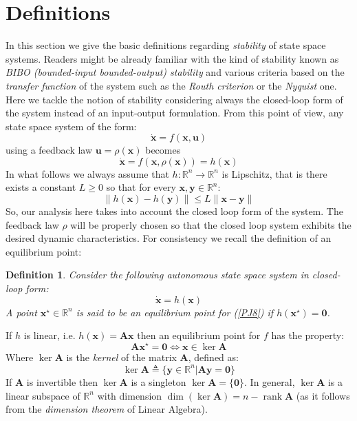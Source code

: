 \documentclass[a4paper,10pt,oneside]{book}
\newtheorem{definition}{Definition}
\begin{document}
\section{Definitions}
In this section we give the basic definitions regarding \emph{stability} of state space systems. Readers might be already familiar with the kind of stability known as \emph{BIBO (bounded-input bounded-output) stability} and various criteria based on the \emph{transfer function} of the system such as the \emph{Routh criterion} or the \emph{Nyquist} one. Here we tackle the notion of stability considering always the closed-loop form of the system instead of an input-output formulation. From this point of view, any state space system of the form:
\begin{equation}
 \dot{\mathbf{x}}=f(\mathbf{x},\mathbf{u})
\end{equation}
using a feedback law $\mathbf{u}=\rho(\mathbf{x})$ becomes
\begin{equation}
 \dot{\mathbf{x}}=f(\mathbf{x},\rho(\mathbf{x}))=h(\mathbf{x})
\end{equation}
In what follows we always assume that $h:\mathbb{R}^n\to\mathbb{R}^n$ is Lipschitz, that is there exists a constant $L\geq 0$ so that for every $\mathbf{x},\mathbf{y}\in\mathbb{R}^n$:
\begin{equation}
 \|h(\mathbf{x})-h(\mathbf{y})\|\leq L\|\mathbf{x}-\mathbf{y}\|
\end{equation}
So, our analysis here takes into account the closed loop form of the system. The feedback law $\rho$ will be properly chosen so that the closed loop system exhibits the desired dynamic characteristics. For consistency we recall the definition of an equilibrium point:
\begin{definition}
 Consider the following autonomous state space system in closed-loop form:
\begin{equation}
 \dot{\mathbf{x}}=h(\mathbf{x})\label{PJ8}
\end{equation}
A point $\mathbf{x}^\star\in\mathbb{R}^n$ is said to be an equilibrium point for (\ref{PJ8}) if $h(\mathbf{x}^\star)=\mathbf{0}$.
\end{definition}
If $h$ is linear, i.e. $h(\mathbf{x})=\mathbf{Ax}$ then an equilibrium point for $f$ has the property:
\begin{equation}
 \mathbf{Ax}^\star=\mathbf{0}\Leftrightarrow\mathbf{x}\in\operatorname{ker}\mathbf{A}
\end{equation}
Where $\operatorname{ker}\mathbf{A}$ is the \emph{kernel} of the matrix $\mathbf{A}$, defined as:
\begin{equation}
 \operatorname{ker}\mathbf{A}\triangleq\{\mathbf{y}\in\mathbb{R}^n|\mathbf{Ay}=\mathbf{0}\}
\end{equation}
If $\mathbf{A}$ is invertible then $\operatorname{ker}\mathbf{A}$ is a singleton $\operatorname{ker}\mathbf{A}=\{\mathbf{0}\}$. In general, $\operatorname{ker}\mathbf{A}$ is a linear subspace of $\mathbb{R}^n$ with dimension $\operatorname{dim}(\operatorname{ker}\mathbf{A})=n-\operatorname{rank}\mathbf{A}$ (as it follows from the \emph{dimension theorem} of Linear Algebra).
\end{document}
